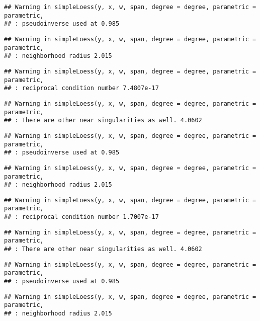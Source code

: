 \documentclass[
]{article}
\begin{document}
\begin{verbatim}
## Warning in simpleLoess(y, x, w, span, degree = degree, parametric = parametric,
## : pseudoinverse used at 0.985
\end{verbatim}

\begin{verbatim}
## Warning in simpleLoess(y, x, w, span, degree = degree, parametric = parametric,
## : neighborhood radius 2.015
\end{verbatim}

\begin{verbatim}
## Warning in simpleLoess(y, x, w, span, degree = degree, parametric = parametric,
## : reciprocal condition number 7.4807e-17
\end{verbatim}

\begin{verbatim}
## Warning in simpleLoess(y, x, w, span, degree = degree, parametric = parametric,
## : There are other near singularities as well. 4.0602
\end{verbatim}

\begin{verbatim}
## Warning in simpleLoess(y, x, w, span, degree = degree, parametric = parametric,
## : pseudoinverse used at 0.985
\end{verbatim}

\begin{verbatim}
## Warning in simpleLoess(y, x, w, span, degree = degree, parametric = parametric,
## : neighborhood radius 2.015
\end{verbatim}

\begin{verbatim}
## Warning in simpleLoess(y, x, w, span, degree = degree, parametric = parametric,
## : reciprocal condition number 1.7007e-17
\end{verbatim}

\begin{verbatim}
## Warning in simpleLoess(y, x, w, span, degree = degree, parametric = parametric,
## : There are other near singularities as well. 4.0602
\end{verbatim}

\begin{verbatim}
## Warning in simpleLoess(y, x, w, span, degree = degree, parametric = parametric,
## : pseudoinverse used at 0.985
\end{verbatim}

\begin{verbatim}
## Warning in simpleLoess(y, x, w, span, degree = degree, parametric = parametric,
## : neighborhood radius 2.015
\end{verbatim}
\end{document}
